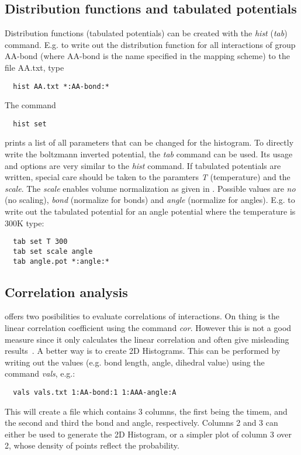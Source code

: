 \subsection{Distribution functions and tabulated potentials}
Distribution functions (tabulated potentials) can be created with the \textit{hist} (\textit{tab}) command.
E.g. to write out the distribution function for all interactions of group AA-bond (where AA-bond is the name specified in the mapping scheme) to the file AA.txt, type
\begin{verbatim}
  hist AA.txt *:AA-bond:*
\end{verbatim}
The command
\begin{verbatim}
  hist set
\end{verbatim}
prints a list of all parameters that can be changed for the histogram. To directly write the boltzmann inverted potential, the \textit{tab} command can be used. Its usage and options are very similar to the \textit{hist} command. If tabulated potentials are written, special care should be taken to the paramters \textit{T} (temperature) and the \textit{scale}. The \textit{scale} enables volume normalization as given in . Possible values are \textit{no} (no scaling), \textit{bond} (normalize for bonds) and \textit{angle} (normalize for angles). E.g. to write out the tabulated potential for an angle potential where the temperature is 300K type:
\begin{verbatim}
  tab set T 300
  tab set scale angle
  tab angle.pot *:angle:*
\end{verbatim}

\subsection{Correlation analysis}
 offers two posibilities to evaluate correlations of interactions. On thing is the linear correlation coefficient using the command \textit{cor}. However this is not a good measure since it only calculates the linear correlation and often give misleading results~\cite{Ruehle:2009.a}. A better way is to create 2D Histograms. This can be performed by writing out the values (e.g. bond length, angle, dihedral value) using the command \textit{vals}, e.g.:
\begin{verbatim}
  vals vals.txt 1:AA-bond:1 1:AAA-angle:A
\end{verbatim}
This will create a file which contains 3 columns, the first being the timem, and the second and third the bond and angle, respectively. Columns 2 and 3 can either be used to generate the 2D Histogram, or a simpler plot of column 3 over 2, whose density of points reflect the probability.
